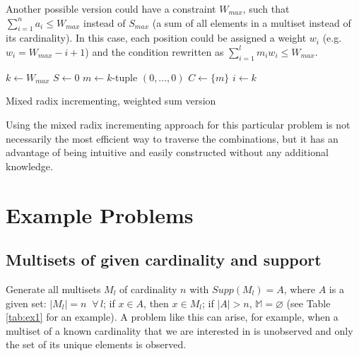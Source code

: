 \documentclass[12pt]{article}
\begin{document}
Another possible version could have a constraint $W_{max}$, such that $\sum_{i = 1}^n a_i \leqslant W_{max}$ instead of $S_{max}$ (a sum of all elements in a multiset instead of its cardinality). In this case, each position could be assigned a weight $w_i$ (e.g. $w_i = W_{max} - i + 1$) and the condition rewritten as $\sum_{i = 1}^l m_i w_i \leqslant W_{max}$. \\

\begin{algorithm}[H]  \label{alg:mirsaW}
  
  \BlankLine
  $k \gets W_{max}$\;
  $S \gets 0$\;
  $m \gets k$-tuple $(0, ..., 0)$\;  
  $C \gets \{m\}$\;
  $i \gets k$\;
  \caption{Mixed radix incrementing, weighted sum version}
\end{algorithm}  

\vspace{5mm}
Using the mixed radix incrementing approach for this particular problem is not necessarily the most efficient way to traverse the combinations, but it has an advantage of being intuitive and easily constructed without any additional knowledge. 

\section{Example Problems}


\subsection{Multisets of given cardinality and support} \label{sec:ex1}

Generate all multisets $M_l$ of cardinality $n$ with $Supp(M_l) = A$, where $A$ is a given set: $|M_l| = n \;\; \forall \, l$; if $x \in A$, then $x \in M_l$; if $|A| > n$, $\mathbb{M} = \varnothing$ (see Table \ref{tab:ex1} for an example). A problem like this can arise, for example, when a multiset of a known cardinality that we are interested in is unobserved and only the set of its unique elements is observed. \\
\end{document}
